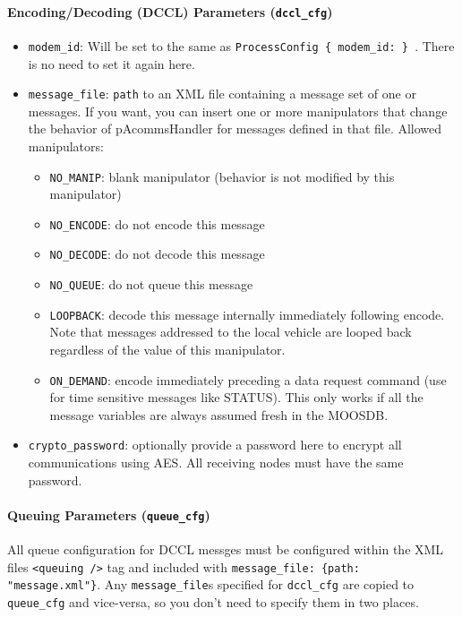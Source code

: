 \documentclass[11pt, letterpaper, oneside]{memoir}
\begin{document}
\paragraph{Encoding/Decoding (DCCL) Parameters (\texttt{dccl\_cfg})} \label{dccl_param}
\begin{itemize}
\item \verb|modem_id|: Will be set to the same as \verb|ProcessConfig { modem_id: } |. There is no need to set it again here.
\item \verb|message_file|: \verb|path| to an XML file containing a message set of one or messages. If you want, you can insert one or more manipulators that change the behavior of pAcommsHandler for messages defined in that file. Allowed manipulators:
\begin{itemize}
\item \verb|NO_MANIP|: blank manipulator (behavior is not modified by this manipulator)
\item \verb|NO_ENCODE|: do not encode this message
\item \verb|NO_DECODE|: do not decode this message
\item \verb|NO_QUEUE|: do not queue this message
\item \verb|LOOPBACK|: decode this message internally immediately following encode. Note that messages addressed to the local vehicle are looped back regardless of the value of this manipulator.
\item \verb|ON_DEMAND|: encode immediately preceding  a data request command (use for time sensitive messages like STATUS). This only works if all the message variables are always assumed fresh in the MOOSDB.
\end{itemize}
\item \verb|crypto_password|: optionally provide a password here to encrypt all communications using AES. All receiving nodes must have the same password.
\end{itemize}

\paragraph{Queuing Parameters (\texttt{queue\_cfg})} \label{sec:xmlqueue}
All queue configuration for DCCL messges must be configured within the XML files \verb|<queuing />| tag and included with \verb|message_file: {path: "message.xml"}|. Any \verb|message_file|s specified for \verb|dccl_cfg| are copied to \verb|queue_cfg| and vice-versa, so you don't need to specify them in two places.
\end{document}
